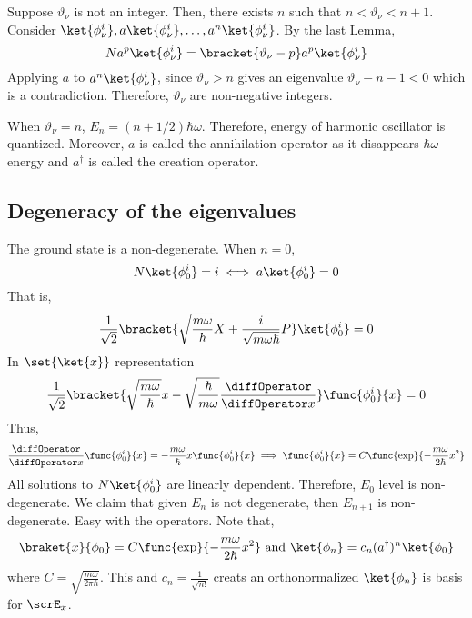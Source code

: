 \begin{prooflemma}
    Suppose \(\vartheta_{\nu}\) is not an integer. Then, there exists \(n\) such that \(n < \vartheta_{\nu} < n + 1\). Consider \(\ket{\phi_{\nu}^i}, a \ket{\phi_{\nu}^i} , \dots, a^n\ket{\phi_{\nu}^i}\). By the last Lemma,
    \begin{equation*}
        Na^{p}\ket{\phi_{\nu}^i} = \bracket{\vartheta_{\nu} - p} a^p \ket{\phi_{\nu}^i}
    \end{equation*}
    Applying \(a\) to \(a^n \ket{\phi_{\nu}^i}\), since \(\vartheta_{\nu} > n\) gives an eigenvalue \(\vartheta_{\nu} - n -1 < 0\) which is a contradiction. Therefore, \(\vartheta_{\nu}\) are non-negative integers.
\end{prooflemma}
When \(\vartheta_{\nu} = n\), \(E_n = (n + 1/2) \hbar \omega\). Therefore, energy of harmonic oscillator is quantized. Moreover, \(a\) is called the annihilation operator as it disappears \(\hbar \omega\) energy and \(a^{\dagger}\) is called the creation operator.

\subsection{Degeneracy of the eigenvalues}
\begin{lemma}
    The ground state is a non-degenerate. When \(n = 0\),
    \begin{equation*}
        N \ket{\phi_0^i} = i \iff a \ket{\phi_0^i} = 0
    \end{equation*}
    That is,
    \begin{equation*}
        \dfrac{1}{\sqrt{2}} \bracket{ \sqrt{\dfrac{m \omega}{\hbar}} X +
            \dfrac{i}{\sqrt{m \omega \hbar}} P } \ket{\phi_0^i} = 0
    \end{equation*}
    In \(\set{\ket{x}}\) representation
    \begin{equation*}
        \dfrac{1}{\sqrt{2}} \bracket{ \sqrt{\dfrac{m \omega}{\hbar}} x -
            \sqrt{\dfrac{\hbar}{m \omega }} \frac{\diffOperator}{\diffOperator x} } \func{\phi_0^i}{x}= 0
    \end{equation*}
    Thus,
    \begin{equation*}
        \frac{\diffOperator}{\diffOperator x}\func{\phi_0^i}{x}= - \dfrac{m \omega}{\hbar} x \func{\phi_0^i}{x} \implies \func{\phi_0^i}{x} = C \func{\exp}{- \frac{m \omega}{2 \hbar} x^2}
    \end{equation*}
    All solutions to \(N \ket{\phi_0^i}\) are linearly dependent. Therefore, \(E_0\) level is non-degenerate. We claim that given \(E_n\) is not degenerate, then \(E_{n+ 1}\) is non-degenerate. Easy with the operators. Note that,
    \begin{equation*}
        \braket{x}{\phi_0} = C \func{\exp}{- \frac{m \omega}{2 \hbar} x^2} \ \text{and} \ \ket{\phi_n} = c_n (a^{\dagger})^n \ket{\phi_0}
    \end{equation*}
    where \(C = \sqrt{\frac{m \omega}{ 2 \pi \hbar}}\). This and \(c_n = \frac{1}{\sqrt{n!}}\) creats an orthonormalized \(\ket{\phi_n}\) is basis for \(\scrE_x\).
\end{lemma}
